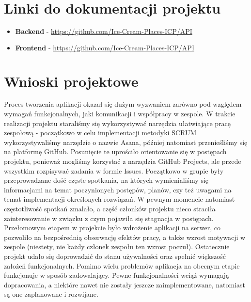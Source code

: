 \documentclass{article}
\begin{document}
    \section{Linki do dokumentacji projektu}
    \begin{itemize}
        \item \textbf{Backend} - \href{https://github.com/Ice-Cream-Places-ICP/API}{https://github.com/Ice-Cream-Places-ICP/API}
        \item \textbf{Frontend} - 
    \href{https://github.com/Ice-Cream-Places-ICP/WEB}{https://github.com/Ice-Cream-Places-ICP/API}
    \end{itemize}
    \section{Wnioski projektowe}
    Proces tworzenia aplikacji okazał się dużym wyzwaniem zarówno pod względem wymagań funkcjonalnych, jaki komunikacji i współpracy w zespole. W trakcie realizacji projektu staraliśmy się wykorzystywać narzędzia ułatwiające pracę zespołową - początkowo w celu implementacji metodyki SCRUM wykorzystywaliśmy narzędzie o nazwie Asana, później natomiast przenieśliśmy się na platformę GitHub. Posunięcie te uprościło orientowanie się w postępach projektu, ponieważ mogliśmy korzystać z narzędzia GitHub Projects, ale przede wszystkim rozpisywać zadania w formie Issues. 
    Początkowo w grupie były przeprowadzane dość częste spotkania, na których wymienialiśmy się informacjami na temat poczynionych postępów, planów, czy też uwagami na temat implementacji określonych rozwiązań. W pewnym momencie natomiast częstotliwość spotkań zmalało, a część członków projektu nieco straciła zainteresowanie w związku z czym pojawiła się stagnacja w postępach. 
    Przełomowym etapem w projekcie było wdrożenie aplikacji na serwer, co pozwoliło na bezpośrednią obserwację efektów pracy, a także wzrost motywacji w zespole (niestety, nie każdy członek zespołu ten wzrost poczuł). 
    Ostatecznie projekt udało się doprowadzić do stanu używalności oraz spełnić większość założeń funkcjonalnych. Pomimo wielu problemów aplikacja na obecnym etapie funkcjonuje w sposób zadowalający. Pewne funkcjonalności wciąż wymagają dopracowania, a niektóre nawet nie zostały jeszcze zaimplementowane, natomiast są one zaplanowane i rozwijane. 
\end{document}
